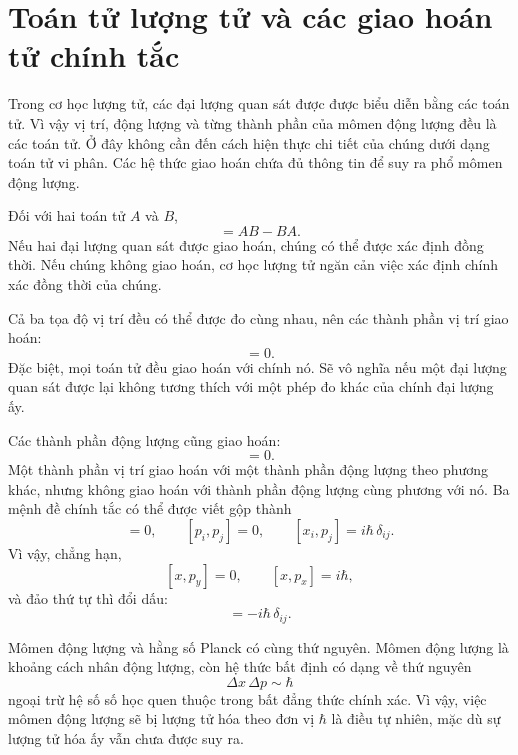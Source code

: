 \section{Toán tử lượng tử và các giao hoán tử chính tắc}

Trong cơ học lượng tử, các đại lượng quan sát được được biểu diễn bằng các toán tử. Vì vậy vị trí, động lượng và từng thành phần của mômen động lượng đều là các toán tử. Ở đây không cần đến cách hiện thực chi tiết của chúng dưới dạng toán tử vi phân. Các hệ thức giao hoán chứa đủ thông tin để suy ra phổ mômen động lượng.

Đối với hai toán tử \(A\) và \(B\),
\begin{equation}
[A,B]=AB-BA.
\end{equation}
Nếu hai đại lượng quan sát được giao hoán, chúng có thể được xác định đồng thời. Nếu chúng không giao hoán, cơ học lượng tử ngăn cản việc xác định chính xác đồng thời của chúng.

Cả ba tọa độ vị trí đều có thể được đo cùng nhau, nên các thành phần vị trí giao hoán:
\begin{equation}
[x_i,x_j]=0.
\end{equation}
Đặc biệt, mọi toán tử đều giao hoán với chính nó. Sẽ vô nghĩa nếu một đại lượng quan sát được lại không tương thích với một phép đo khác của chính đại lượng ấy.

Các thành phần động lượng cũng giao hoán:
\begin{equation}
[p_i,p_j]=0.
\end{equation}
Một thành phần vị trí giao hoán với một thành phần động lượng theo phương khác, nhưng không giao hoán với thành phần động lượng cùng phương với nó. Ba mệnh đề chính tắc có thể được viết gộp thành
\begin{equation}
[x_i,x_j]=0,\qquad
[p_i,p_j]=0,\qquad
[x_i,p_j]=i\hbar\,\delta_{ij}.
\end{equation}
Vì vậy, chẳng hạn,
\[
[x,p_y]=0,\qquad [x,p_x]=i\hbar,
\]
và đảo thứ tự thì đổi dấu:
\begin{equation}
[p_j,x_i]=-i\hbar\,\delta_{ij}.
\end{equation}

Mômen động lượng và hằng số Planck có cùng thứ nguyên. Mômen động lượng là khoảng cách nhân động lượng, còn hệ thức bất định có dạng về thứ nguyên
\begin{equation}
\Delta x\,\Delta p\sim\hbar
\end{equation}
ngoại trừ hệ số số học quen thuộc trong bất đẳng thức chính xác. Vì vậy, việc mômen động lượng sẽ bị lượng tử hóa theo đơn vị \(\hbar\) là điều tự nhiên, mặc dù sự lượng tử hóa ấy vẫn chưa được suy ra.


